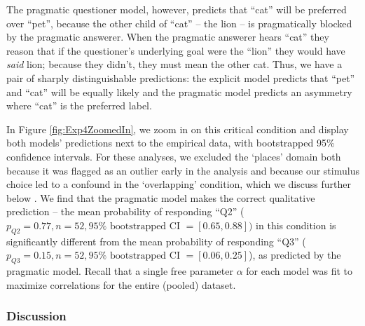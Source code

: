 \documentclass[12pt, floatsintext, jou]{apa6}
\begin{document}
The pragmatic questioner model, however, predicts that ``cat'' will be preferred over ``pet'', because the other child of ``cat'' -- the lion -- is pragmatically blocked by the pragmatic answerer. When the pragmatic answerer hears ``cat'' they reason that if the questioner's underlying goal were the ``lion'' they would have \emph{said} lion; because they didn't, they must mean the other cat. Thus, we have a pair of sharply distinguishable predictions: the explicit model predicts that ``pet'' and ``cat'' will be equally likely and the pragmatic model predicts an asymmetry where ``cat'' is the preferred label. 

In Figure \ref{fig:Exp4ZoomedIn}, we zoom in on this critical condition and display both models' predictions next to the empirical data, with bootstrapped 95\% confidence intervals. For these analyses, we excluded the `places' domain both because it was flagged as an outlier early in the analysis and because our stimulus choice led to a confound in the `overlapping' condition, which we discuss further below . We find that the pragmatic model makes the correct qualitative prediction -- the mean probability of responding ``Q2'' ($p_{Q2} = 0.77, n = 52, 95\%\textrm{ bootstrapped CI }= [0.65, 0.88])$ in this condition is significantly different from the mean probability of responding ``Q3'' ($p_{Q3} = 0.15, n = 52, 95\% \textrm{ bootstrapped CI }=[0.06, 0.25]$), as predicted by the pragmatic model. 
Recall that a single free parameter $\alpha$ for each model was fit to maximize correlations for the entire (pooled) dataset. 


\subsubsection{Discussion}

%
%
%
% 
\end{document}
